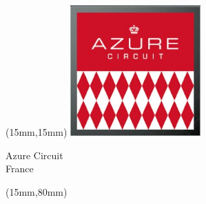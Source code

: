 \begin{textblock*}{50mm}(15mm,15mm)%
\includegraphics[width=50mm]{LG/2015-05-20_00072.png}
\par Azure Circuit\\ France
\end{textblock*}
\begin{textblock*}{185mm}(15mm,80mm)%
\end{textblock*}
